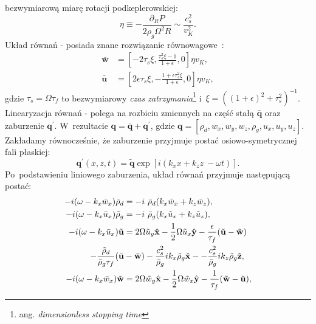 bezwymiarową miarę rotacji podkeplerowskiej:
%
\begin{equation}
\eta \equiv - \frac{\partial_R P}{2\rho_g\Omega^2 R} \sim \frac{c_s^2}{v_K^2}.
\end{equation}
%
Układ równań - posiada znane rozwiązanie
równowagowe~\citep{N86}:
%
\begin{align}
\bar{\mathbf{w}} &= \left[ 
 -2\tau_s\xi, \frac{\tau_s^2\xi - 1}{1+\epsilon},
 0
\right]\eta v_K, \label{eq:w0}\\
\bar{\mathbf{u}} &= \left[ 
 2\epsilon\tau_s\xi, -\frac{1 + \epsilon\tau_s^2\xi}{1+\epsilon},
 0
\right]\eta v_K, \label{eq:u0}
\end{align}
%
gdzie $\tau_s = \Omega \tau_f$ to bezwymiarowy \emph{czas
zatrzymania}\footnote{ang. \emph{dimensionless stopping time}} i~$\xi =
((1+\epsilon)^2 + \tau_s^2)^{-1}$.  Linearyzacja równań -
polega na rozbiciu zmiennych na część stałą $\bar{\mathbf{q}}$ oraz zaburzenie
$\mathbf{q}^\prime$. W~rezultacie $\mathbf{q} =
\bar{\mathbf{q}} + \mathbf{q}^\prime$, gdzie $\mathbf{q}=[\rho_d, w_x, w_y, w_z,
\rho_g, u_x, u_y, u_z]$. Zakładamy równocześnie, że zaburzenie przyjmuje postać
osiowo-symetrycznej fali płaskiej:
%
\begin{equation}
   \label{eq:planar}
   \mathbf{q}^\prime(x,z,t) = \tilde{\mathbf{q}}
 \exp\left[i(k_x x + k_z z~-\omega t)\right].
\end{equation}
%
Po~podstawieniu liniowego zaburzenia, układ równań przyjmuje następującą postać:
%
\begin{align}
-i(\omega- k_x\bar{w}_x)\tilde{\rho}_d &= 
 - i~\bar{\rho}_d(k_x\tilde{w}_x + k_z\tilde{w}_z), \label{lin1}\\
-i(\omega- k_x\bar{u}_x)\tilde{\rho}_g &= 
 - i~\bar{\rho}_g(k_x\tilde{u}_x + k_z\tilde{u}_z), \label{lin2}\\
-i(\omega- k_x\bar{u}_x)\tilde{\mathbf{u}} &= 
 2\Omega \tilde{u}_y\hat{\mathbf{x}} - \frac{1}{2}\Omega \tilde{u}_x
 \hat{\mathbf{y}}
 -\frac{\epsilon}{\tau_f}(\tilde{\mathbf{u}} - \tilde{\mathbf{w}}) \notag\\
  -\frac{\tilde{\rho}_d}{\bar{\rho}_g\tau_f}
  (\bar{\mathbf{u}} &- \bar{\mathbf{w}})
  - \frac{c_s^2}{\bar{\rho}_g}ik_x\tilde{\rho}_g\hat{\mathbf{x}} -
  - \frac{c_s^2}{\bar{\rho}_g}ik_z\tilde{\rho}_g\hat{\mathbf{z}}, \label{lin3}\\
-i(\omega- k_x\bar{w}_x)\tilde{\mathbf{w}} &= 
 2\Omega \tilde{w}_y\hat{\mathbf{x}} - \frac{1}{2}\Omega \tilde{w}_x
 \hat{\mathbf{y}} 
 - \frac{1}{\tau_f} (\tilde{\mathbf{w}} - \tilde{\mathbf{u}}), \label{lin4}
\end{align}
